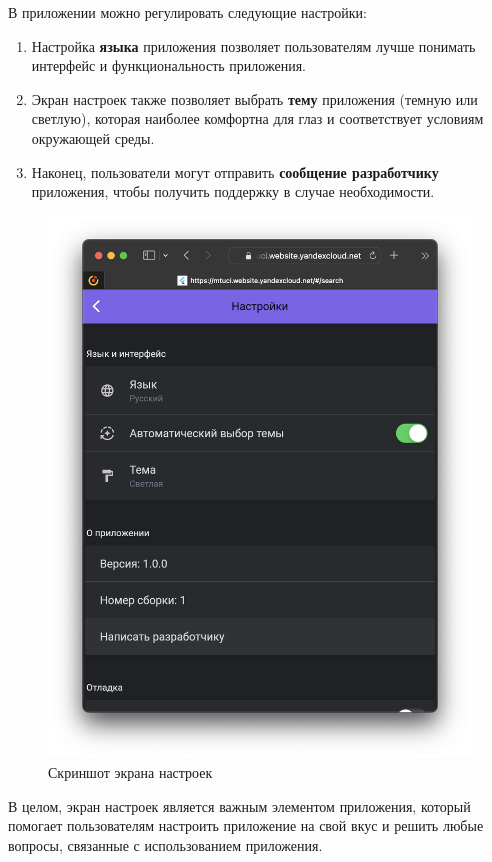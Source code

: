 В приложении можно регулировать следующие настройки:
\begin{enumerate}
    \item Настройка \textbf{языка} приложения позволяет пользователям лучше понимать интерфейс и функциональность приложения.
    \item Экран настроек также позволяет выбрать \textbf{тему} приложения (темную или светлую),
    которая наиболее комфортна для глаз и соответствует условиям окружающей среды. 
    \item Наконец, пользователи могут отправить \textbf{сообщение разработчику} приложения,
    чтобы получить поддержку в случае необходимости.
\end{enumerate}

\begin{figure}
\centering
\includegraphics[width=0.8\linewidth]{images/app/settings.png}
\caption{Скриншот экрана настроек}
\label{fig:app:settings}
\end{figure}

В целом, экран настроек является важным элементом приложения,
который помогает пользователям настроить приложение на свой вкус и
решить любые вопросы, связанные с использованием приложения.

\break
